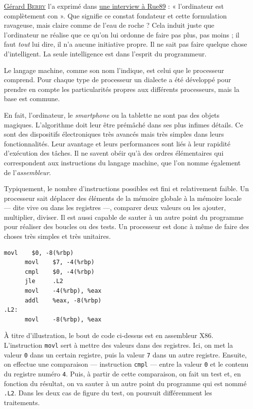 \href{https://www.college-de-france.fr/site/gerard-berry/#course}{Gérard \textsc{Berry}} l'a exprimé dans \href{http://rue89.nouvelobs.com/2016/08/26/gerard-berry-lordinateur-est-completement-con-257428}{une interview à Rue89} : « l'ordinateur est complètement con ». Que signifie ce constat fondateur et cette formulation ravageuse, mais claire comme de l'eau de roche ? Cela induit juste que l'ordinateur ne réalise que ce qu'on lui ordonne de faire pas plus, pas moins ; il faut \textit{tout} lui dire, il n'a aucune initiative propre. Il ne sait pas faire quelque chose d'intelligent. La seule intelligence est dans l'esprit du programmeur. 

Le langage machine, comme son nom l'indique, est celui que le processeur comprend. Pour chaque type de processeur un dialecte a été développé pour prendre en compte les particularités propres aux différents processeurs, mais la base est commune.

En fait, l'ordinateur, le \textit{smartphone} ou la tablette ne sont pas des objets magiques. L'algorithme doit leur être prémâché dans ses plus infimes détails. Ce sont des dispositifs électroniques très avancés mais très simples dans leurs fonctionnalités. Leur avantage et leurs performances sont liés à leur rapidité d'exécution des tâches. Il ne savent obéir qu'à des ordres élémentaires qui correspondent aux instructions du langage machine, que l'on nomme également de l'\textit{assembleur}.

Typiquement, le nombre d'instructions possibles est fini et relativement faible. Un processeur sait déplacer des éléments de la mémoire globale à la mémoire locale --- dite vive ou dans les registres ---, comparer deux valeurs ou les ajouter, multiplier, diviser. Il est aussi capable de sauter à un autre point du programme pour réaliser des boucles ou des tests. Un processeur est donc à même de faire des choses très simples et très unitaires.

\vspace{6pt}

\begin{lstlisting}[style=lstassemblerstyle]
      movl    $0, -8(%rbp)
      movl    $7, -4(%rbp)
      cmpl    $0, -4(%rbp)
      jle     .L2
      movl    -4(%rbp), %eax
      addl    %eax, -8(%rbp)
.L2:
      movl    -8(%rbp), %eax 
\end{lstlisting}

\vspace{6pt}

À titre d'illustration, le bout de code ci-dessus est en assembleur X86. L'instruction \texttt{movl} sert à mettre des valeurs dans des registres. Ici, on met la valeur \texttt{0} dans un certain registre, puis la valeur \texttt{7} dans un autre registre. Ensuite, on effectue une comparaison --- instruction \texttt{cmpl} --- entre la valeur \texttt{0} et le contenu du registre numéro \texttt{4}. Puis, à partir de cette comparaison, on fait un test et, en fonction du résultat, on va sauter à un autre point du programme qui est nommé \texttt{.L2}. Dans les deux cas de figure du test, on poursuit différemment les traitements. 

